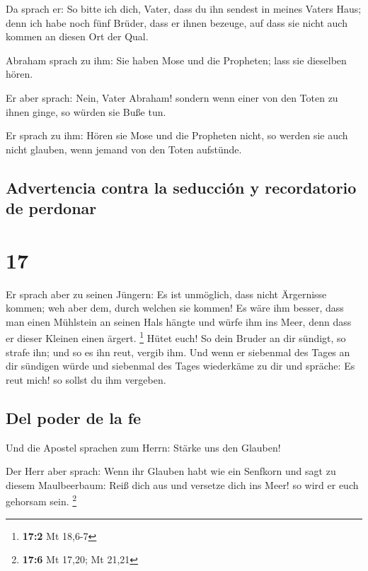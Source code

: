  Da sprach er: So bitte ich dich, Vater, dass du ihn
sendest in meines Vaters Haus;  denn ich habe noch fünf
Brüder, dass er ihnen bezeuge, auf dass sie nicht auch kommen an diesen
Ort der Qual.

 Abraham sprach zu ihm: Sie haben Mose und die Propheten;
lass sie dieselben hören.

 Er aber sprach: Nein, Vater Abraham! sondern wenn einer
von den Toten zu ihnen ginge, so würden sie Buße tun.

 Er sprach zu ihm: Hören sie Mose und die Propheten
nicht, so werden sie auch nicht glauben, wenn jemand von den Toten
aufstünde.

\hypertarget{advertencia-contra-la-seducciuxf3n-y-recordatorio-de-perdonar}{%
\subsection{Advertencia contra la seducción y recordatorio de
perdonar}\label{advertencia-contra-la-seducciuxf3n-y-recordatorio-de-perdonar}}

\hypertarget{section-16}{%
\section{17}\label{section-16}}

 Er sprach aber zu seinen Jüngern: Es ist unmöglich, dass
nicht Ärgernisse kommen; weh aber dem, durch welchen sie kommen!
 Es wäre ihm besser, dass man einen Mühlstein an seinen
Hals hängte und würfe ihm ins Meer, denn dass er dieser Kleinen einen
ärgert. \footnote{\textbf{17:2} Mt 18,6-7}  Hütet euch! So
dein Bruder an dir sündigt, so strafe ihn; und so es ihn reut, vergib
ihm.  Und wenn er siebenmal des Tages an dir sündigen
würde und siebenmal des Tages wiederkäme zu dir und spräche: Es reut
mich! so sollst du ihm vergeben.

\hypertarget{del-poder-de-la-fe}{%
\subsection{Del poder de la fe}\label{del-poder-de-la-fe}}

 Und die Apostel sprachen zum Herrn: Stärke uns den
Glauben!

 Der Herr aber sprach: Wenn ihr Glauben habt wie ein
Senfkorn und sagt zu diesem Maulbeerbaum: Reiß dich aus und versetze
dich ins Meer! so wird er euch gehorsam sein. \footnote{\textbf{17:6} Mt
  17,20; Mt 21,21}

